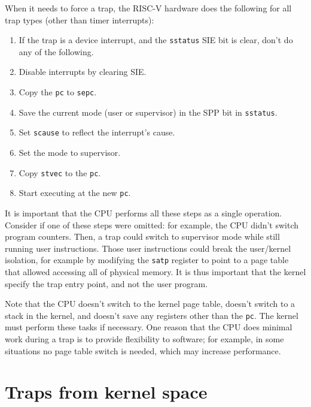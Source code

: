 When it needs to force a trap, the RISC-V hardware does the
following for all trap types (other than timer interrupts):

\begin{enumerate}

\item If the trap is a device interrupt, and the {\tt sstatus} SIE bit
  is clear, don't do any of the following.

\item Disable interrupts by clearing SIE.

\item Copy the {\tt pc} to {\tt sepc}.

\item Save the current mode (user or supervisor) in the SPP bit in {\tt sstatus}.

\item Set {\tt scause} to reflect the interrupt's cause.

\item Set the mode to supervisor.

\item Copy {\tt stvec} to the {\tt pc}.

\item Start executing at the new {\tt pc}.

\end{enumerate}

It is important that the CPU performs all these steps as
a single operation.
Consider if one of these steps were omitted: for example, the CPU
didn't switch program counters. Then, a trap could switch to
supervisor mode while still running user instructions. Those user
instructions could break the user/kernel isolation, for example by
modifying the {\tt satp} register to point to a page table that
allowed accessing all of physical memory. It is thus important that
the kernel specify the trap entry point, and not the user program.

Note that the CPU doesn't switch to the kernel page table, doesn't
switch to a stack in the kernel, and doesn't save any registers other
than the {\tt pc}. The kernel must perform these tasks if necessary.
One reason that the CPU does minimal work during a trap is to provide
flexibility to software; for example, in some situations no page table
switch is needed, which may increase performance.

\section{Traps from kernel space}

